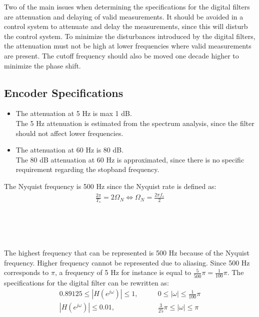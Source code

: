 Two of the main issues when determining the specifications for the digital filters are attenuation and delaying of valid measurements. It should be avoided in a control system to attenuate and delay the measurements, since this will disturb the control system. To minimize the disturbances introduced by the digital filters, the attenuation must not be high at lower frequencies where valid measurements are present. The cutoff frequency should also be moved one decade higher to minimize the phase shift. 

\subsection*{Encoder Specifications}
\begin{itemize}
\item The attenuation at 5 Hz is max 1 dB. \\
The 5 Hz attenuation is estimated from the spectrum analysis, since the filter should not affect lower frequencies. 
\item The attenuation at 60 Hz is 80 dB.\\
The 80 dB attenuation at 60 Hz is approximated, since there is no specific requirement regarding the stopband frequency.
\end{itemize}
The Nyquist frequency is 500 Hz since the Nyquist rate is defined as\citep[p. 170]{oppenheim}:
\begin{align}
\frac{2\pi}{T_s} = 2\Omega_N \Leftrightarrow \Omega_N = \frac{2\pi f_s}{2}
\end{align}
\begin{where}
\\
\\
\\
\end{where}

The highest frequency that can be represented is 500 Hz because of the Nyquist frequency. Higher frequency cannot be represented due to aliasing. Since 500 Hz corresponds to $\pi$, a frequency of 5 Hz for instance is equal to $\frac{5}{500} \pi =\frac{1}{100} \pi$. The specifications for the digital filter can be rewritten as:
\begin{align}
0.89125 \le |H(e^{j\omega})| \le 1,& \qquad 0 \le |\omega | \le \frac{1}{100} \pi \\
|H(e^{j\omega})| \le 0.01,& \qquad \frac{3}{25} \pi \le |\omega | \le \pi
\end{align}
\begin{where}
\\
\end{where}

